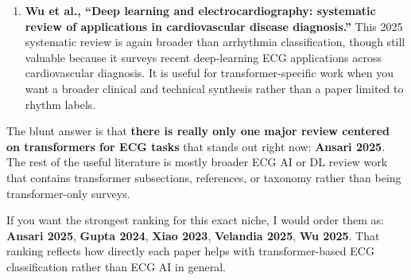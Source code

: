 \documentclass[sigconf,nonacm]{acmart}
\begin{document}
{\begin{enumerate}
  \item \textbf{Wu et al., ``Deep learning and electrocardiography: systematic review of applications in cardiovascular disease diagnosis.''} This 2025 systematic review is again broader than arrhythmia classification, though still valuable because it surveys recent deep-learning ECG applications across cardiovascular diagnosis. It is useful for transformer-specific work when you want a broader clinical and technical synthesis rather than a paper limited to rhythm labels.
\end{enumerate}
The blunt answer is that \textbf{there is really only one major review centered on transformers for ECG tasks} that stands out right now: \textbf{Ansari 2025}. The rest of the useful literature is mostly broader ECG AI or DL review work that contains transformer subsections, references, or taxonomy rather than being transformer-only surveys.

If you want the strongest ranking for this exact niche, I would order them as: \textbf{Ansari 2025}, \textbf{Gupta 2024}, \textbf{Xiao 2023}, \textbf{Velandia 2025}, \textbf{Wu 2025}. That ranking reflects how directly each paper helps with transformer-based ECG classification rather than ECG AI in general.}
\end{document}
